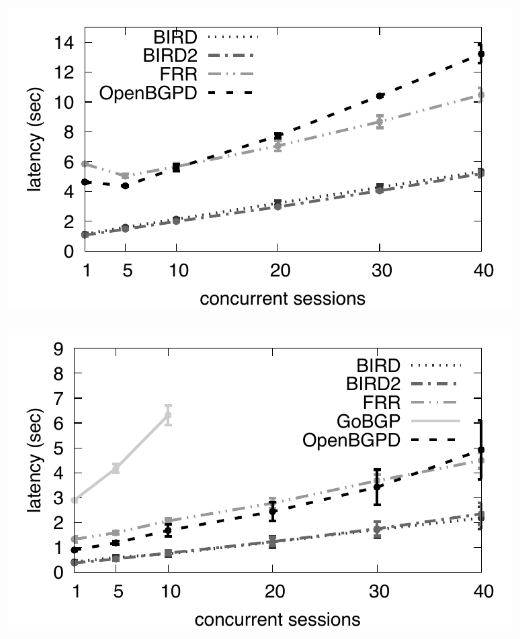 \begin{minipage}[c]{.49\linewidth}
	\centering
	\includegraphics[width=\linewidth]{images/table-transfer-scalability.pdf}
	\label{fig:tbl-transfer-scalability}
\end{minipage}
\begin{minipage}[c]{.49\linewidth}
	\centering
	\includegraphics[width=\linewidth]{images/ssbt-scalability.pdf}
	 \label{fig:ssbt-scalability}
\end{minipage}

\hfill

